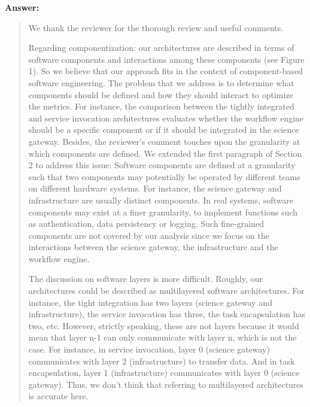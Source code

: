 \documentclass[a4]{article}
\newenvironment{answer}%
{\textbf{Answer:}\begin{small}\begin{quote}}%
{\end{quote}\end{small}}%
\newcommand{\revised}[1]{\color{blue} #1\color{black}\xspace}
\begin{document}
\begin{answer}
We thank the reviewer for the thorough review and useful comments.

Regarding componentization: our architectures are described in terms
of software components and interactions among these components (see
Figure 1). So we believe that our approach fits in the context of
component-based software engineering. The problem that we address is
to determine what components should be defined and how they should
interact to optimize the metrics. For instance, the comparison between
the tightly integrated and service invocation architectures evaluates
whether the workflow engine should be a specific component or if it
should be integrated in the science gateway. Besides, the reviewer's
comment touches upon the granularity at which components are
defined. We extended the first paragraph of Section 2 to address this issue:
\revised{Software
  components are defined at a granularity such that two components may
  potentially be operated by different teams on different hardware
  systems. For instance, the science gateway and infrastructure are
  usually distinct components. In real systems, software components
  may exist at a finer granularity, to implement functions such as
  authentication, data persistency or logging. Such fine-grained
  components are not covered by our analysis since we focus on the
  interactions between the science gateway, the infrastructure and the
  workflow engine.}

The discussion on software layers is more difficult. Roughly, our
architectures could be described as multilayered software
architectures. For instance, the tight integration has two layers
(science gateway and infrastructure), the service invocation has
three, the task encapsulation has two, etc. However, strictly
speaking, these are not layers because it would mean that layer n-1
can only communicate with layer n, which is not the case. For
instance, in service invocation, layer 0 (science gateway)
communicates with layer 2 (infrastructure) to transfer data. And in
task encapsulation, layer 1 (infrastructure) communicates with layer 0
(science gateway). Thus, we don't think that referring to multilayered
architectures is accurate here. 


\end{answer}
\end{document}
